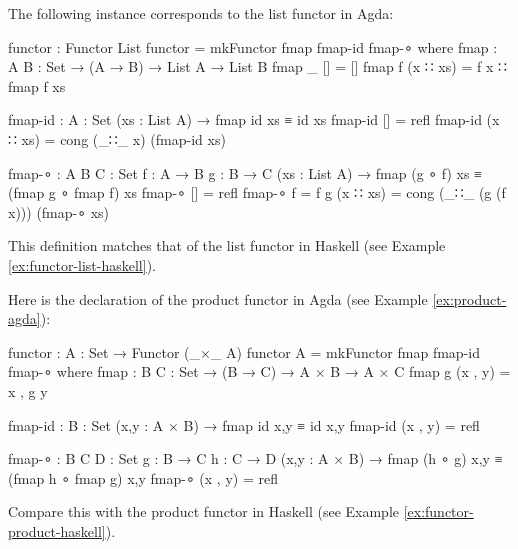 \begin{example}
  \label{ex:functor-list-agda}

  The following instance corresponds to the list functor in Agda:
  \begin{codeagda}
functor : Functor List
functor = mkFunctor fmap fmap-id fmap-∘
  where
    fmap : {A B : Set} → (A → B) → List A → List B
    fmap _ []       = []
    fmap f (x ∷ xs) = f x ∷ fmap f xs

    fmap-id : {A : Set} (xs : List A) → fmap id xs ≡ id xs
    fmap-id []       = refl
    fmap-id (x ∷ xs) = cong (_∷_ x) (fmap-id xs)

    fmap-∘ : {A B C : Set} {f : A → B} {g : B → C}
             (xs : List A) → fmap (g ∘ f) xs ≡ (fmap g ∘ fmap f) xs
    fmap-∘             []       = refl
    fmap-∘ {f = f} {g} (x ∷ xs) = cong (_∷_ (g (f x))) (fmap-∘ xs)
  \end{codeagda}
  This definition matches that of the list functor in Haskell (see
  Example \ref{ex:functor-list-haskell}).

\end{example}

\begin{example}
  \label{ex:functor-product-agda}

  Here is the declaration of the product functor in Agda (see Example
  \ref{ex:product-agda}):
  \begin{codeagda}
functor : {A : Set} → Functor (_×_ A)
functor {A} = mkFunctor fmap fmap-id fmap-∘
  where
    fmap : {B C : Set} → (B → C) → A × B → A × C
    fmap g (x , y) = x , g y

    fmap-id : {B : Set} (x,y : A × B) → fmap id x,y ≡ id x,y
    fmap-id (x , y) = refl

    fmap-∘ : {B C D : Set} {g : B → C} {h : C → D}
             (x,y : A × B) → fmap (h ∘ g) x,y ≡ (fmap h ∘ fmap g) x,y
    fmap-∘ (x , y) = refl
  \end{codeagda}
  Compare this with the product functor in Haskell (see Example
  \ref{ex:functor-product-haskell}).

\end{example}

